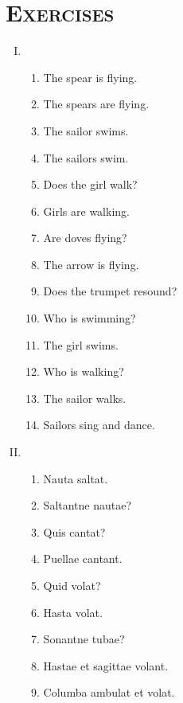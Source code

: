\documentclass[12pt]{article}
\begin{document}
\section{\textsc{Exercises}}
\begin{enumerate}[I.]
	\setlength{\itemsep}{1em}
	\item \begin{enumerate}[1)]
		\item The spear is flying.
		\item The spears are flying.
		\item The sailor swims.
		\item The sailors swim.
		\item Does the girl walk?
		\item Girls are walking.
		\item Are doves flying?
		\item The arrow is flying.
		\item Does the trumpet resound?
		\item Who is swimming?
		\item The girl swims.
		\item Who is walking?
		\item The sailor walks.
		\item Sailors sing and dance.
	\end{enumerate}
	\item \begin{enumerate}[1)]
		\item Nauta saltat.
		\item Saltantne nautae?
		\item Quis cantat?
		\item Puellae cantant.
		\item Quid volat?
		\item Hasta volat.
		\item Sonantne tubae?
		\item Hastae et sagittae volant.
		\item Columba ambulat et volat.
	\end{enumerate}
\end{enumerate}
\end{document}
